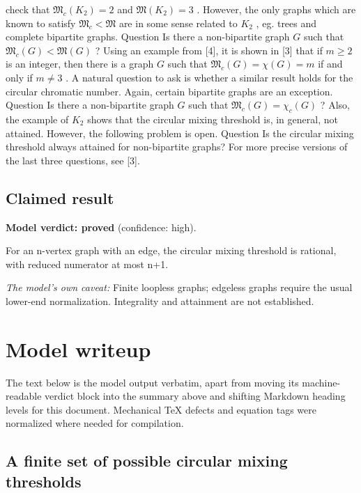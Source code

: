 \documentclass[
  11pt,
  a4paper,
]{article}
\begin{document}
\begin{itemize}
  check that \(\mathfrak{M}_c(K_2) = 2\) and \(\mathfrak{M}(K_2) = 3\) .
  However, the only graphs which are known to satisfy
  \(\mathfrak{M}_c < \mathfrak{M}\) are in some sense related to \(K_2\)
  , eg. trees and complete bipartite graphs. Question Is there a
  non-bipartite graph \(G\) such that
  \(\mathfrak{M}_c(G) < \mathfrak{M}(G)\) ? Using an example from
  {[}4{]}, it is shown in {[}3{]} that if \(m\geq2\) is an integer, then
  there is a graph \(G\) such that \(\mathfrak{M}_c(G) = \chi(G) = m\)
  if and only if \(m\neq 3\) . A natural question to ask is whether a
  similar result holds for the circular chromatic number. Again, certain
  bipartite graphs are an exception. Question Is there a non-bipartite
  graph \(G\) such that \(\mathfrak{M}_c(G) =\chi_c(G)\) ? Also, the
  example of \(K_2\) shows that the circular mixing threshold is, in
  general, not attained. However, the following problem is open.
  Question Is the circular mixing threshold always attained for
  non-bipartite graphs? For more precise versions of the last three
  questions, see {[}3{]}.
\end{itemize}

\subsection{Claimed result}\label{claimed-result}

\textbf{Model verdict: proved} (confidence: high).

For an n-vertex graph with an edge, the circular mixing threshold is
rational, with reduced numerator at most n+1.

\emph{The model's own caveat:} Finite loopless graphs; edgeless graphs
require the usual lower-end normalization. Integrality and attainment
are not established.

\section{Model writeup}\label{model-writeup}

The text below is the model output verbatim, apart from moving its
machine-readable verdict block into the summary above and shifting
Markdown heading levels for this document. Mechanical TeX defects and
equation tags were normalized where needed for compilation.

\subsection{A finite set of possible circular mixing
thresholds}\label{a-finite-set-of-possible-circular-mixing-thresholds}
\end{document}
